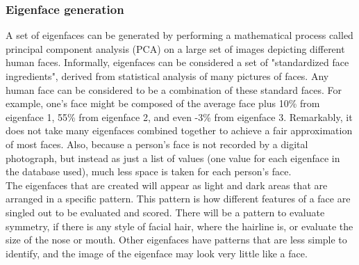 \documentclass[12pt]{article}			%
\begin{document}
\subsubsection{ Eigenface generation }
A set of eigenfaces can be generated by performing a mathematical process called principal component analysis (PCA) on a large set of images depicting different human faces. Informally, eigenfaces can be considered a set of "standardized face ingredients", derived from statistical analysis of many pictures of faces. Any human face can be considered to be a combination of these standard faces. For example, one's face might be composed of the average face plus 10\% from eigenface 1, 55\% from eigenface 2, and even -3\% from eigenface 3. Remarkably, it does not take many eigenfaces combined together to achieve a fair approximation of most faces. Also, because a person's face is not recorded by a digital photograph, but instead as just a list of values (one value for each eigenface in the database used), much less space is taken for each person's face.\\

The eigenfaces that are created will appear as light and dark areas that are arranged in a specific pattern. This pattern is how different features of a face are singled out to be evaluated and scored. There will be a pattern to evaluate symmetry, if there is any style of facial hair, where the hairline is, or evaluate the size of the nose or mouth. Other eigenfaces have patterns that are less simple to identify, and the image of the eigenface may look very little like a face.\\
\end{document}
